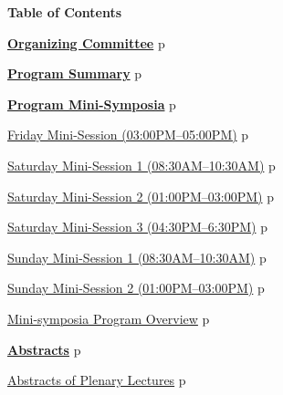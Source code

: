 \newpage\newpage
\thispagestyle{empty}
\newpage
\clearpage


\thispagestyle{empty}
\centerline{\bfseries\Large Table of Contents}
\vspace{4ex}

\noindent
\hyperref[committee]{{\bfseries\large  Organizing Committee}}%
\dotfill{}p\pageref{committee}
\vspace{3ex}

\noindent
\hyperref[programsummary]{{\bfseries\large  Program Summary}}%
\dotfill{}p\pageref{programsummary}
\vspace{3ex}

\noindent
\hyperref[program]{{\bfseries\large  Program Mini-Symposia}}%
\dotfill{}p\pageref{program}
\vspace{2ex}

\noindent\quad\hyperref[mini-friday]{{\large Friday Mini-Session (03:00PM--05:00PM)}}%
\dotfill{}p\pageref{mini-friday}
\vspace{2ex}

\noindent\quad\hyperref[mini-saturday1]{{\large Saturday Mini-Session 1 (08:30AM--10:30AM)}}%
\dotfill{}p\pageref{mini-saturday1}
\vspace{1ex}

\noindent\quad\hyperref[mini-saturday2]{{\large Saturday Mini-Session 2 (01:00PM--03:00PM)}}%
\dotfill{}p\pageref{mini-saturday2}
\vspace{1ex}

\noindent\quad\hyperref[mini-saturday3]{{\large Saturday Mini-Session 3 (04:30PM--6:30PM)}}%
\dotfill{}p\pageref{mini-saturday3}
\vspace{2ex}

\noindent\quad\hyperref[mini-sunday1]{{\large Sunday Mini-Session 1 (08:30AM--10:30AM)}}
\dotfill{}p\pageref{mini-sunday1}
\vspace{1ex}

\noindent\quad\hyperref[mini-sunday2]{{\large Sunday Mini-Session 2 (01:00PM--03:00PM)}}%
\dotfill{}p\pageref{mini-sunday2}
\vspace{3ex}

\noindent\quad\hyperref[prog-overview]{{\large Mini-symposia Program Overview}}%
\dotfill{}p\pageref{prog-overview}
\vspace{3ex}

\noindent\hyperref[abstracts]{{\bfseries\large Abstracts}}%
\dotfill{}p\pageref{abstracts}
\vspace{2ex}

\noindent\quad\hyperref[plenary]{{\large  Abstracts of Plenary Lectures}}%
\dotfill{}p\pageref{plenary}
\vspace{1ex}

